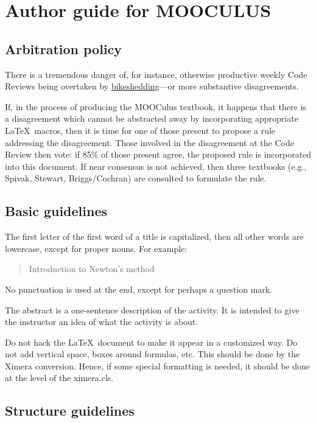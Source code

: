 \documentclass{article}
\newcommand{\mooculus}{\textsf{\textbf{MOOC}\textnormal{\textsf{ULUS}}}}
\begin{document}
\section*{Author guide for \mooculus}

\subsection*{Arbitration policy}

There is a tremendous danger of, for instance, otherwise productive
weekly Code Reviews being overtaken by
\href{http://en.wikipedia.org/wiki/Parkinson's_law_of_triviality}{bikeshedding}---or more substantive disagreements.

If, in the process of producing the MOOCulus textbook, it happens that
there is a disagreement which cannot be abstracted away by
incorporating appropriate \LaTeX\ macros, then it is time for one of
those present to propose a rule addressing the disagreement.  Those
involved in the disagreement at the Code Review then vote: if 85\% of
those present agree, the proposed rule is incorporated into this
document.  If near consensus is not achieved, then three textbooks
(e.g., Spivak, Stewart, Briggs/Cochran) are consulted to formulate the
rule.




\subsection*{Basic guidelines}

The first letter of the first word of a title is capitalized, then all
other words are lowercase, except for proper nouns. For example:
\begin{quote}
Introduction to Newton's method
\end{quote}
No punctuation is used at the end, except for perhaps a question mark.


The abstract is a one-sentence description of the activity. It is
intended to give the instructor an idea of what the activity is about.


Do not hack the \LaTeX\ document to make it appear in a customized
way. Do not add vertical space, boxes around formulas, etc. This
should be done by the Ximera conversion. Hence, if some special
formatting is needed, it should be done at the level of the
ximera.cls.


\subsection*{Structure guidelines}
\end{document}
